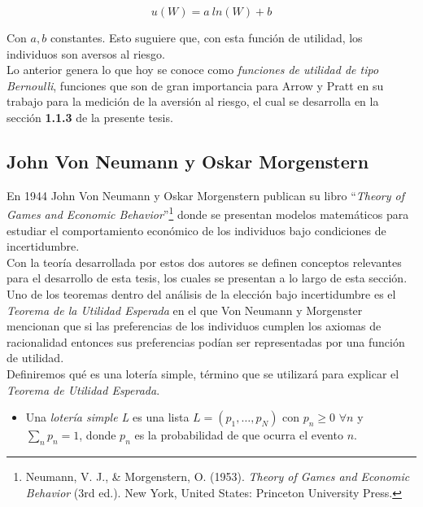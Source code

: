 \begin{equation}
    u(W) = a \: ln(W) + b
\end{equation}

Con $a,b$ constantes. Esto suguiere que, con esta función de utilidad, los individuos son aversos al riesgo. \\

Lo anterior genera lo que hoy se conoce como \textit{funciones de utilidad de tipo Bernoulli}, funciones que son de gran importancia para Arrow y Pratt en su trabajo para la medición de la aversión al riesgo, el cual se desarrolla en la sección \textbf{1.1.3} de la presente tesis.

\newpage

\subsection{John Von Neumann y Oskar Morgenstern}

En 1944 John Von Neumann y Oskar Morgenstern publican su libro “\textit{Theory of Games and Economic Behavior}”\footnote{Neumann, V. J., \& Morgenstern, O. (1953). \textit{Theory of Games and Economic Behavior} (3rd ed.). New York, United States: Princeton University Press.} donde se presentan modelos matemáticos para estudiar el comportamiento económico de los individuos bajo condiciones de incertidumbre.   \\

Con la teoría desarrollada por estos dos autores se definen conceptos relevantes para el desarrollo de esta tesis, los cuales se presentan a lo largo de esta sección. \\

Uno de los teoremas dentro del análisis de la elección bajo incertidumbre es el \textit{Teorema de la Utilidad Esperada} en el que Von Neumann y Morgenster mencionan que si las preferencias de los individuos cumplen los axiomas de racionalidad entonces sus preferencias podían ser representadas por una función de utilidad. \\

Definiremos qué es una lotería simple, término que se utilizará para explicar el \textit{Teorema de Utilidad Esperada}.

\begin{itemize}
    \item Una \textit{lotería simple L} es una lista $L = (p_1, \dots, p_N)$ con $p_n \geq 0$ $\forall n$ y $\sum_n p_n = 1$, donde $p_n$ es la probabilidad de que ocurra el evento $n$.
\end{itemize}

